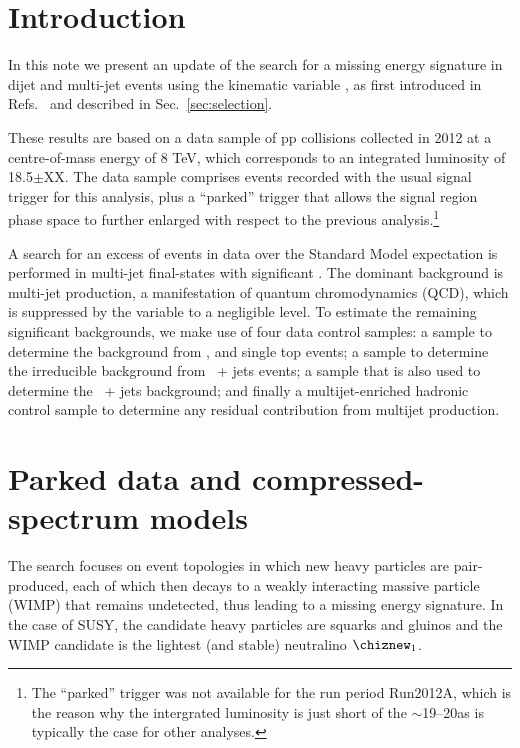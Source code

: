 \clearpage
\section{Introduction \label{sec:intro}}

In this note we present an update of the search for a missing energy
signature in dijet and multi-jet events using the kinematic variable
\alphat, as first introduced in Refs.~\cite{Randall:2008rw,
  cms-pas-sus-08005, cms-pas-sus-09001} and described in
Sec.~\ref{sec:selection}. 

These results are based on a data sample of pp collisions collected in
2012 at a centre-of-mass energy of 8 TeV, which corresponds to an
integrated luminosity of 18.5$\pm$XX\fbinv. The data sample comprises
events recorded with the usual signal trigger for this analysis, plus
a ``parked'' trigger that allows the signal region phase space to
further enlarged with respect to the previous analysis.\footnote{The
  ``parked'' trigger was not available for the run period Run2012A,
  which is the reason why the intergrated luminosity is just short of
  the $\sim$19--20\fbinv as is typically the case for other analyses.}

A search for an excess of events in data over the Standard Model
expectation is performed in multi-jet final-states with significant
\met. The dominant background is multi-jet production, a manifestation
of quantum chromodynamics (QCD), which is suppressed by the \alphat
variable to a negligible level. To estimate the remaining significant
backgrounds, we make use of four data control samples: a \mj sample to
determine the background from \wj, \ttbar and single top events; a \gj
sample to determine the irreducible background from \znunu\ + jets
events; a \mmj sample that is also used to determine the \znunu\ +
jets background; and finally a multijet-enriched hadronic control
sample to determine any residual contribution from multijet
production.

\section{Parked data and compressed-spectrum models \label{sec:parked}}

The search focuses on event topologies in which new heavy particles
are pair-produced, each of which then decays to a weakly interacting
massive particle (WIMP) that remains undetected, thus leading to a
missing energy signature. In the case of SUSY, the candidate heavy
particles are squarks and gluinos and the WIMP candidate is the
lightest (and stable) neutralino $\chiznew_1$. 


